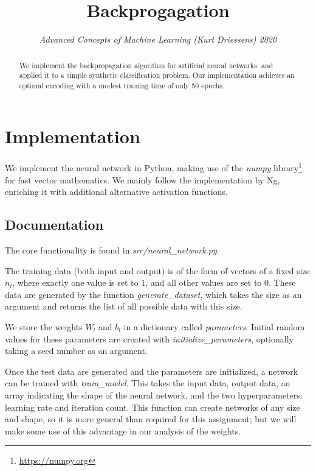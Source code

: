 \documentclass[conference]{IEEEtran}
\title{Backprogagation}
\author{\IEEEauthorblockN{JingYang Zeng, David Pomerenke} 
\textit{Advanced Concepts of Machine Learning (Kurt Driessens) 2020} \\
\IEEEauthorblockA{\textit{Department of Data Science and Knowledge Engineering, Maastricht University}
}}
\begin{document}
\maketitle

\thispagestyle{plain} %
\pagestyle{plain} %

\begin{abstract}
    We implement the backpropagation algorithm for artificial neural networks, and applied it to a simple synthetic classification problem. Our implementation achieves an optimal encoding with a modest training time of only 50 epochs.
\end{abstract}



\section{Implementation}

We implement the neural network in Python, making use of the \textit{numpy} library\footnote{\url{https://numpy.org}} for fast vector mathematics. We mainly follow the implementation by Ng\cite{ng_sparse_2011}, enriching it with additional alternative activation functions.

\subsection{Documentation}

The core functionality is found in \textit{src/neural\_network.py}.

The training data (both input and output) is of the form of vectors of a fixed size $n_l$, where exactly one value is set to $1$, and all other values are set to $0$. These data are generated by the function \textit{generate\_dataset}, which takes the size as an argument and returns the list of all possible data with this size.

We store the weights $W_l$ and $b_l$ in a dictionary called \textit{parameters}. Initial random values for these parameters are created with \textit{initialize\_parameters}, optionally taking a seed number as an argument.

Once the test data are generated and the parameters are initialized, a network can be trained with \textit{train\_model}. This takes the input data, output data, an array indicating the shape of the neural network, and the two hyperparameters: learning rate and iteration count. This function can create networks of any size and shape, so it is more general than required for this assignment; but we will make some use of this advantage in our analysis of the weights.
\end{document}
